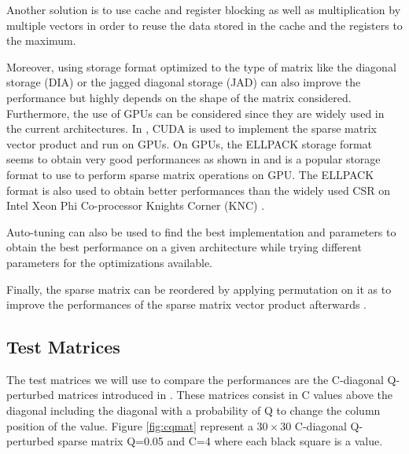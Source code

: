 Another solution is to use cache and register blocking as well as multiplication by multiple vectors \cite{Vuduc2003phd} \cite{Im2000phd} in order to reuse the data stored in the cache and the registers to the maximum.


Moreover, using storage format optimized to the type of matrix like the diagonal storage (DIA) \cite{Saad1990}  or the jagged diagonal storage (JAD) \cite{Saad2003} can also improve the performance but highly depends on the shape of the matrix considered.
Furthermore, the use of GPUs can be considered since they are widely used in the current architectures.
In \cite{NiBGS2008}, CUDA \cite{Shane2012} is used to implement the sparse matrix vector product and run on GPUs.
On GPUs, the ELLPACK storage format seems to obtain very good performances as shown in \cite{HuguP2010} and is a popular storage format to use to perform sparse matrix operations on GPU.
The ELLPACK format is also used to obtain better performances than the widely used CSR on Intel Xeon Phi Co-processor Knights Corner (KNC) \cite{LiSCD2013}.


Auto-tuning can also be used to find the best implementation and parameters to obtain the best performance on a given architecture \cite{WOVSY2009} while trying different parameters for the optimizations available.

Finally, the sparse matrix can be reordered by applying permutation on it as to improve the performances of the sparse matrix vector product afterwards \cite{PinaH1999} \cite{VuduM2005}.


\subsection{Test Matrices}

The test matrices we will use to compare the performances are the C-diagonal Q-perturbed matrices introduced in \cite{PetiW1992} \cite{HuguP2010}.
These matrices consist in C values above the diagonal including the diagonal with a probability of Q to change the column position of the value.
Figure \ref{fig:cqmat} represent a $30 \times 30$ C-diagonal Q-perturbed sparse matrix Q=0.05 and C=4 where each black square is a value.


